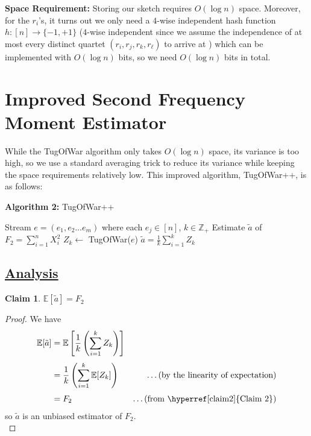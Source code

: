 \documentclass[11pt]{article}
\makeatletter
\newtheorem{claim}{Claim}
\newcommand{\Expect}{\mathbb{E}}
\renewcommand*{\eqref}[1]{%
	\hyperref[{#1}]{\textup{\tagform@{\ref*{#1}}}}%
}
\makeatother
\begin{document}
\noindent \textbf{Space Requirement:} Storing our sketch requires $O(\log n)$ space. Moreover, for the $r_i$'s, it turns out we only need a $4$-wise independent hash function $h : [n] \to \{-1, +1\}$ ($4$-wise independent since we assume the independence of at most every distinct quartet $(r_i, r_j, r_k, r_\ell)$ to arrive at \eqref{eq2}) which can be implemented with $O(\log n)$ bits, so we need $O(\log n)$ bits in total. 

\section{Improved Second Frequency Moment Estimator}
While the \mbox{\sc TugOfWar} algorithm only takes $O(\log n)$ space, its variance is too high, so we use a standard averaging trick to reduce its variance while keeping the space requirements relatively low. This improved algorithm, \mbox{\sc TugOfWar++}, is as follows:
\begin{algorithm}[H]
	\caption*{\textbf{Algorithm 2:} \mbox{\sc TugOfWar++}}
	\begin{algorithmic}[1]
		\Input  Stream $e = (e_1, e_2 \dots e_m)$ where each $e_j \in [n]$, $k \in \mathbb{Z}_+$
		\Output Estimate $\tilde{a}$ of $F_2 = \sum_{i=1}^{n} X_i^2$
		\State $Z_k \gets$ \mbox{\sc TugOfWar}($e$)
		\EndFor
		\OutputS $\tilde{a} = \frac{1}{k} \sum_{i=1}^{k}Z_k$
	\end{algorithmic}
\end{algorithm}

\newpage

\subsection*{\underline{Analysis}}

\begin{claim}
	$\Expect[\tilde{a}] = F_2$
\end{claim}
\begin{proof}
We have
\begin{align*}
\Expect[\tilde{a}] &= \Expect \left[\frac{1}{k} \left(\sum_{i=1}^{k}Z_k \right)\right] \\[3pt]
&= \frac{1}{k} \left(\sum_{i=1}^{k} \Expect[Z_k]\right) & \textrm{\dots (by the linearity of expectation)} \\[3pt]
&= F_2 & \textrm{\dots (from \hyperref[claim2]{Claim 2})}
\end{align*}
so $\tilde{a}$ is an unbiased estimator of $F_2$.	\\
\end{proof}
\end{document}
